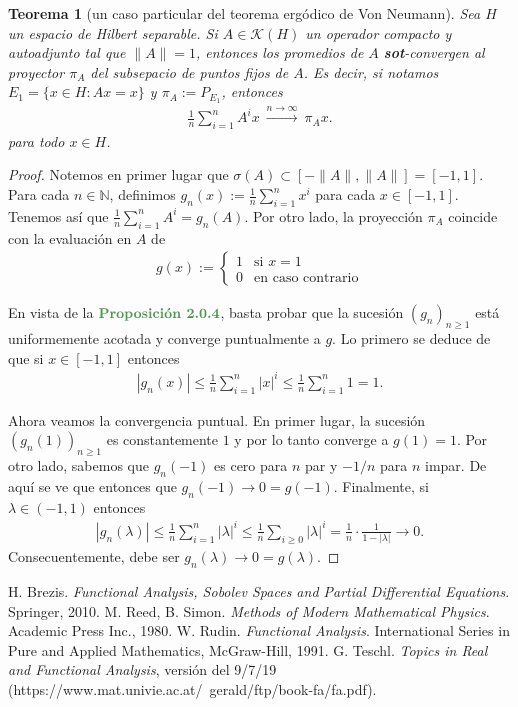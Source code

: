 \documentclass[11pt]{report}
\theoremstyle{colored}
\newtheorem{theorem}{Teorema}[section]
\newcommand{\N}{\mathbb{N}}
\newcommand{\paint}[1]{\color{color}{#1}}
\newcommand{\tpaint}[1]{\paint{\textbf{#1}}}
\begin{document}
\begin{theorem}[un caso particular del teorema ergódico de Von Neumann] Sea $H$ un espacio de Hilbert separable. Si $A \in \mathscr{K}(H)$ un operador compacto y autoadjunto tal que $\|A\| = 1$, entonces los promedios de $A$ \textbf{sot}-convergen al proyector $\pi_A$ del subsepacio de puntos fijos de $A$. Es decir, si notamos $E_1 = \{x \in H : Ax = x\}$ y $\pi_A := P_{E_1}$, entonces
\begin{align*}
\frac{1}{n}\sum_{i=1}^{n}A^ix \ \xrightarrow{n \to \infty} \ \pi_Ax.
\end{align*}
para todo $x \in H$.
\end{theorem}
\begin{proof} Notemos en primer lugar que $\sigma(A) \subset [-\|A\|,\|A\|] = [-1,1]$. Para cada $n \in \N$, definimos $g_n(x) := \frac{1}{n}\sum_{i=1}^nx^i$ para cada $x \in [-1,1]$. Tenemos así que $\frac{1}{n}\sum_{i=1}^{n}A^i = g_n(A)$. Por otro lado, la proyección $\pi_A$ coincide con la evaluación en $A$ de 
\begin{align*}
g(x) := \begin{cases}
1 &\text{si $x = 1$}\\
0 &\text{en caso contrario}
\end{cases}
\end{align*}

En vista de la $\tpaint{Proposición 2.0.4}$, basta probar que la sucesión $(g_n)_{n \geq 1}$ está uniformemente acotada y converge puntualmente a $g$. Lo primero se deduce de que si $x \in [-1,1]$ entonces
\begin{align*}
|g_n(x)| \leq \frac{1}{n}\sum_{i=1}^n|x|^i \leq \frac{1}{n}\sum_{i=1}^n1 = 1.
\end{align*}

Ahora veamos la convergencia puntual. En primer lugar, la sucesión $(g_n(1))_{n \geq 1}$ es constantemente $1$ y por lo tanto converge a $g(1) = 1$. Por otro lado, sabemos que $g_n(-1)$ es cero para $n$ par y $-1/n$ para $n$ impar. De aquí se ve que entonces que $g_n(-1) \to 0 = g(-1)$. Finalmente, si $\lambda \in (-1,1)$ entonces
\begin{align*}
|g_n(\lambda)| \leq \frac{1}{n}\sum_{i=1}^n|\lambda|^i \leq \frac{1}{n}\sum_{i \geq 0}|\lambda|^i = \frac{1}{n} \cdot \frac{1}{1-|\lambda|} \to 0.
\end{align*}
Consecuentemente, debe ser $g_n(\lambda) \to 0 = g(\lambda)$.
\end{proof}
\begin{thebibliography}{}
 H. Brezis. \textit{Functional Analysis, Sobolev Spaces and Partial Differential Equations}. Springer, 2010.
 M. Reed, B. Simon. \textit{Methods of Modern Mathematical Physics}.  Academic Press Inc., 1980.
 W. Rudin. \textit{Functional Analysis}. International Series in Pure and Applied Mathematics, McGraw-Hill, 1991.
 G. Teschl. \textit{Topics in Real and Functional Analysis}, versión del 9/7/19 (https://www.mat.univie.ac.at/~gerald/ftp/book-fa/fa.pdf).

\end{thebibliography}
\end{document}
